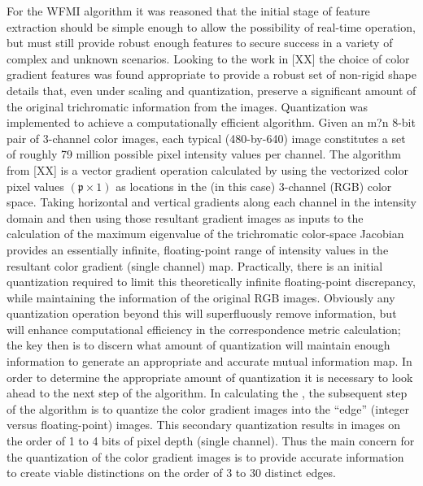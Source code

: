 %
%
%
%
%
%

%
%
%



For the WFMI algorithm it was reasoned that the initial stage of feature extraction should be simple enough to allow the possibility of real-time operation, but must still provide robust enough features to secure success in a variety of complex and unknown scenarios. Looking to the work in [XX] the choice of color gradient features was found appropriate to provide a robust set of non-rigid shape details that, even under scaling and quantization, preserve a significant amount of the original trichromatic information from the images. Quantization was implemented to achieve a computationally efficient algorithm.
Given an m?n 8-bit pair of 3-channel color images, each typical (480-by-640) image constitutes a set of roughly 79 million possible pixel intensity values per channel. The algorithm from [XX] is a vector gradient operation calculated by using the vectorized color pixel values $(\mathfrak{p}\times1)$ as locations in the (in this case) 3-channel (RGB) color space. Taking horizontal and vertical gradients along each channel in the intensity domain and then using those resultant gradient images as inputs to the calculation of the maximum eigenvalue of the trichromatic color-space Jacobian provides an essentially infinite, floating-point range of intensity values in the resultant color gradient (single channel) map. Practically, there is an initial quantization required to limit this theoretically infinite floating-point discrepancy, while maintaining the information of the original RGB images. Obviously any quantization operation beyond this will superfluously remove information, but will enhance computational efficiency in the correspondence metric calculation; the key then is to discern what amount of quantization will maintain enough information to generate an appropriate and accurate mutual information map.
In order to determine the appropriate amount of quantization it is necessary to look ahead to the next step of the algorithm. In calculating the , the subsequent step of the algorithm is to quantize the color gradient images into the ``edge'' (integer versus floating-point) images. This secondary quantization results in images on the order of 1 to 4 bits of pixel depth (single channel). Thus the main concern for the quantization of the color gradient images is to provide accurate information to create viable distinctions on the order of 3 to 30 distinct edges.



